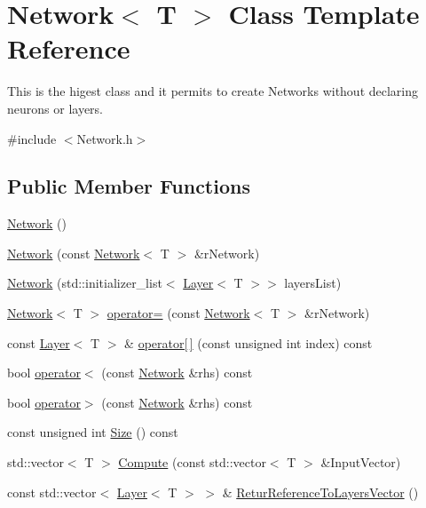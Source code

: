 \hypertarget{class_network}{\section{Network$<$ T $>$ Class Template Reference}
\label{class_network}
}


This is the higest class and it permits to create Networks without declaring neurons or layers.  




{\ttfamily \#include $<$Network.\-h$>$}

\subsection*{Public Member Functions}
\begin{DoxyCompactItemize}
\item 
\hyperlink{class_network_abd7006cd24e1333ed31de0268841e5a4}{Network} ()
\item 
\hyperlink{class_network_a534cb88e47da2fb2e581fb05441d2b68}{Network} (const \hyperlink{class_network}{Network}$<$ T $>$ \&r\-Network)
\item 
\hyperlink{class_network_a89c4ca4ab61bb971843b281aad6d8bb3}{Network} (std\-::initializer\-\_\-list$<$ \hyperlink{class_layer}{Layer}$<$ T $>$$>$ layers\-List)
\item 
\hyperlink{class_network}{Network}$<$ T $>$ \hyperlink{class_network_a846908af5c8ecdde63b9d575086bf83b}{operator=} (const \hyperlink{class_network}{Network}$<$ T $>$ \&r\-Network)
\item 
const \hyperlink{class_layer}{Layer}$<$ T $>$ \& \hyperlink{class_network_a6e6f8026320dcd8b3f673900a2a01529}{operator\mbox{[}$\,$\mbox{]}} (const unsigned int index) const 
\item 
bool \hyperlink{class_network_ab9232111938bdcc18824e33044c8a405}{operator$<$} (const \hyperlink{class_network}{Network} \&rhs) const 
\item 
bool \hyperlink{class_network_ad557cca20ed05beda654ffa68e552df2}{operator$>$} (const \hyperlink{class_network}{Network} \&rhs) const 
\item 
const unsigned int \hyperlink{class_network_a6784de433a045e33e8247f26f942e812}{Size} () const 
\item 
std\-::vector$<$ T $>$ \hyperlink{class_network_a3487cfb19fcb05c7a4c6352130128314}{Compute} (const std\-::vector$<$ T $>$ \&Input\-Vector)
\item 
const std\-::vector$<$ \hyperlink{class_layer}{Layer}$<$ T $>$ $>$ \& \hyperlink{class_network_ae9cae333bdd235de6ce92a952d40d156}{Retur\-Reference\-To\-Layers\-Vector} ()
$$
\end{DoxyCompactItemize}
